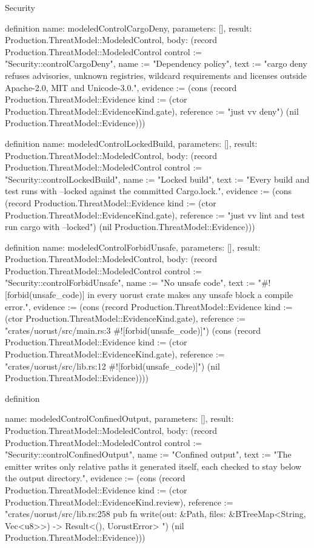 \begin{lexlean}{Security}
\begin{semanticmodule}
{definition{
  name: modeledControlCargoDeny,
  parameters: [],
  result: Production.ThreatModel::ModeledControl,
  body: (record Production.ThreatModel::ModeledControl {control := "Security::controlCargoDeny", name := "Dependency policy", text := "cargo deny refuses advisories, unknown registries, wildcard requirements and licenses outside Apache-2.0, MIT and Unicode-3.0.", evidence := (cons (record Production.ThreatModel::Evidence {kind := (ctor Production.ThreatModel::EvidenceKind.gate), reference := "just vv deny"}) (nil Production.ThreatModel::Evidence))})
}

definition{
  name: modeledControlLockedBuild,
  parameters: [],
  result: Production.ThreatModel::ModeledControl,
  body: (record Production.ThreatModel::ModeledControl {control := "Security::controlLockedBuild", name := "Locked build", text := "Every build and test runs with --locked against the committed Cargo.lock.", evidence := (cons (record Production.ThreatModel::Evidence {kind := (ctor Production.ThreatModel::EvidenceKind.gate), reference := "just vv lint and test run cargo with --locked"}) (nil Production.ThreatModel::Evidence))})
}

definition{
  name: modeledControlForbidUnsafe,
  parameters: [],
  result: Production.ThreatModel::ModeledControl,
  body: (record Production.ThreatModel::ModeledControl {control := "Security::controlForbidUnsafe", name := "No unsafe code", text := "#![forbid(unsafe_code)] in every uorust crate makes any unsafe block a compile error.", evidence := (cons (record Production.ThreatModel::Evidence {kind := (ctor Production.ThreatModel::EvidenceKind.gate), reference := "crates/uorust/src/main.rs:3 #![forbid(unsafe_code)]"}) (cons (record Production.ThreatModel::Evidence {kind := (ctor Production.ThreatModel::EvidenceKind.gate), reference := "crates/uorust/src/lib.rs:12 #![forbid(unsafe_code)]"}) (nil Production.ThreatModel::Evidence)))})
}

definition{
  name: modeledControlConfinedOutput,
  parameters: [],
  result: Production.ThreatModel::ModeledControl,
  body: (record Production.ThreatModel::ModeledControl {control := "Security::controlConfinedOutput", name := "Confined output", text := "The emitter writes only relative paths it generated itself, each checked to stay below the output directory.", evidence := (cons (record Production.ThreatModel::Evidence {kind := (ctor Production.ThreatModel::EvidenceKind.review), reference := "crates/uorust/src/lib.rs:258 pub fn write(out: &Path, files: &BTreeMap<String, Vec<u8>>) -> Result<(), UorustError> {"}) (nil Production.ThreatModel::Evidence))})
}

}}
\end{semanticmodule}
\end{lexlean}
